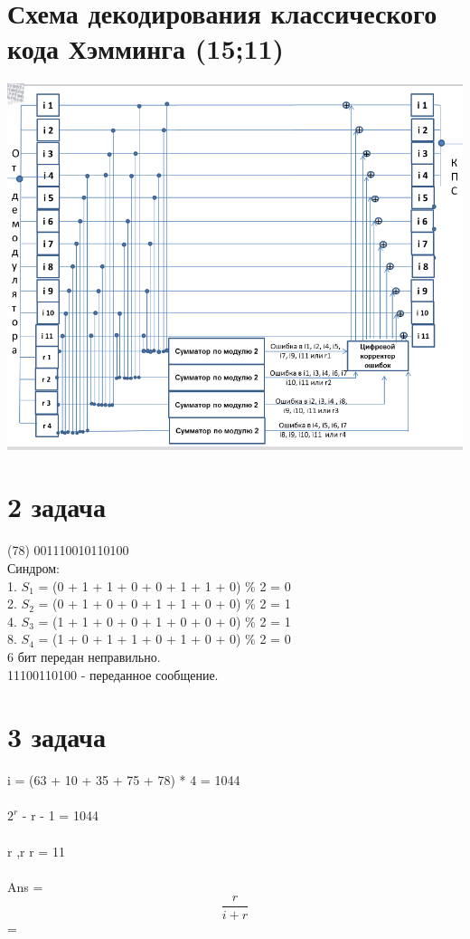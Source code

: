 \documentclass[12pt,onecolumn]{article}
\begin{document}
\section{Схема декодирования классического кода Хэмминга (15;11)}
\includegraphics[width=15cm]{img/img2.png}
\newpage
\section{2 задача}
(78) 001110010110100 \\
   Синдром:\\
   1. $S_1$ = (0 + 1 + 1 + 0 + 0 + 1 + 1 + 0) \% 2 = 0\\
   2. $S_2$ = (0 + 1 + 0 + 0 + 1 + 1 + 0 + 0) \% 2 = 1\\
   4. $S_3$ = (1 + 1 + 0 + 0 + 1 + 0 + 0 + 0) \% 2 = 1\\
   8. $S_4$ = (1 + 0 + 1 + 1 + 0 + 1 + 0 + 0) \% 2 = 0\\
   6 бит передан неправильно.\\
   11100110100 - переданное сообщение.
\newpage
\section{3 задача}
  i = (63 + 10 + 35 + 75 + 78) * 4 = 1044\\
  \\
  $2^r$ - r - 1 = 1044\\
  \\
  r  ,r \in {} \Rightarrow r  = 11\\
  \\
  Ans = $$\frac{r}{i + r}$$ =  \\
  \\
\newpage
\end{document}
